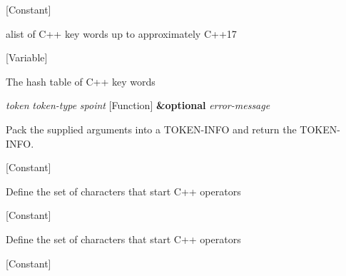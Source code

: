 \vspace{1em}
\noindent
{}
\usebox{\funcname}
 \hfill [Constant]

\begin{doc-string}
alist of C++ key words up to approximately C++17
\end{doc-string}

\vspace{1em}
\noindent
{}
\usebox{\funcname}
 \hfill [Variable]

\begin{doc-string}
The hash table of C++ key words
\end{doc-string}

\vspace{1em}
\noindent
{}
\usebox{\funcname}\emph{token} \emph{token-type} \emph{spoint}
 \hfill [Function]
\hspace*{\wd\funcname}\textbf{\&optional} \emph{error-message}

\begin{doc-string}
Pack the supplied arguments into a TOKEN-INFO and return the TOKEN-INFO.
\end{doc-string}

\vspace{1em}
\noindent
{}
\usebox{\funcname}
 \hfill [Constant]

\begin{doc-string}
Define the set of characters that start C++ operators
\end{doc-string}

\vspace{1em}
\noindent
{}
\usebox{\funcname}
 \hfill [Constant]

\begin{doc-string}
Define the set of characters that start C++ operators
\end{doc-string}

\vspace{1em}
\noindent
{}
\usebox{\funcname}
 \hfill [Constant]

